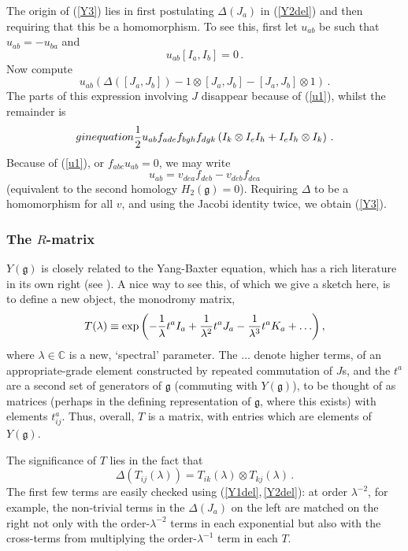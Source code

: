 \documentclass[12pt]{article}
\newcommand{\gf}{\mathfrak{g}}
\begin{document}
The origin of (\ref{Y3}) lies in first postulating $\Delta(J_a)$
in (\ref{Y2del}) and then requiring that this be a homomorphism.
To see this, first let $u_{ab}$ be such that $u_{ab}=-u_{ba}$ and
\begin{equation}\label{u1} u_{ab} [ I_a,I_b ] = 0 \,. \end{equation} Now compute \begin{equation}
u_{ab}\left(\Delta \left( [J_{a},J_{b}] \right) - 1\otimes
[J_a,J_b] - [J_a,J_b] \otimes 1 \right) \,. \end{equation} The parts of this
expression involving $J$ disappear because of (\ref{u1}), whilst
the remainder is
\begin{equation}gin{equation}\label{u2}
{1\over 2}u_{ab}f_{ade}f_{bgh}f_{dgk} \left( I_k \otimes I_e I_h +
I_e I_h\otimes I_k \right) \,.
\end{equation}
Because of (\ref{u1}), or $f_{abc}u_{ab}=0$, we may write \begin{equation}
u_{ab}= v_{dea} f_{deb} - v_{deb} f_{dea}   \end{equation} (equivalent to the
second homology $H_2(\gf)=0$). Requiring $\Delta$ to be a
homomorphism for all $v$, and using the Jacobi identity twice, we
obtain (\ref{Y3}).




\subsubsection{The $R$-matrix}

$Y(\gf)$ is closely related to the Yang-Baxter equation, which has
a rich literature in its own right (see \cite{jimbo}). A nice way
to see this, of which we give a sketch here, is to define a new
object, the monodromy matrix, \begin{equation} T(\lambda) \equiv \exp\left(
-{1\over \lambda}t^aI_a + {1\over \lambda^2}t^aJ_a-{1\over
\lambda^3}t^aK_a+\ldots\right), \end{equation} where $\lambda\in{\mathbb C}$
is a new, `spectral' parameter. The $\ldots$ denote higher terms,
of an appropriate-grade element constructed by repeated
commutation of $J$s, and the $t^a$ are a second set of generators
of $\gf$ (commuting with $Y(\gf)$), to be thought of as matrices
(perhaps in the defining representation of $\gf$, where this
exists) with elements $t^a_{ij}$. Thus, overall, $T$ is a matrix,
with entries which are elements of $Y(\gf)$.

The significance of $T$ lies in the fact that \begin{equation}\label{Tdel}
\Delta(T_{ij}(\lambda))=T_{ik}(\lambda) \otimes
T_{kj}(\lambda)\,.\end{equation} The first few terms are easily checked using
(\ref{Y1del},\,\ref{Y2del}): at order $\lambda^{-2}$, for example,
the non-trivial terms in the $\Delta(J_a)$ on the left are matched
on the right not only with the order-$\lambda^{-2}$ terms in each
exponential but also with the cross-terms from multiplying the
order-$\lambda^{-1}$ term in each $T$.
\end{document}
